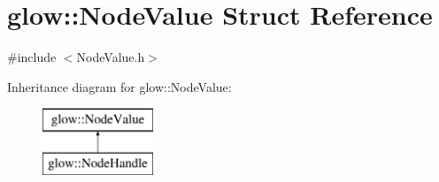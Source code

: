 \hypertarget{structglow_1_1_node_value}{}\section{glow\+:\+:Node\+Value Struct Reference}
\label{structglow_1_1_node_value}


{\ttfamily \#include $<$Node\+Value.\+h$>$}

Inheritance diagram for glow\+:\+:Node\+Value\+:\begin{figure}[H]
\begin{center}
\leavevmode
\includegraphics[height=2.000000cm]{structglow_1_1_node_value}
\end{center}
\end{figure}
